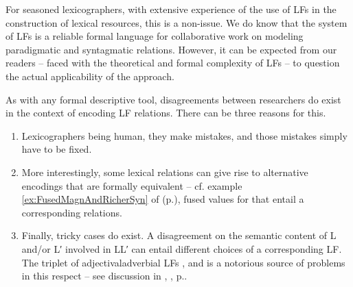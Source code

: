 For seasoned lexicographers, with extensive experience of the use of LFs in the construction of lexical resources, this is a non-issue. We do know that the system of LFs is a reliable formal language for collaborative work on modeling paradigmatic and syntagmatic relations. However, it can be expected from our readers -- faced with the theoretical and formal complexity of LFs -- to question the actual applicability of the approach.

As with any formal descriptive tool, disagreements between researchers do exist in the context of encoding LF relations. There can be three reasons for this.

\begin{enumerate}

\item Lexicographers being human, they make mistakes, and those mistakes simply have to be fixed.

\item More interestingly, some lexical relations can give rise to alternative encodings that are formally equivalent -- cf. example \ref{ex:FusedMagnAndRicherSyn} of  (p.\thinspace\pageref{ex:FusedMagnAndRicherSyn}), fused values for  that entail a corresponding  relations.

\item Finally, tricky cases do exist. A disagreement on the semantic content of L and/or L′ involved in L\thinspace{}\thinspace{}L′ can entail different choices of a corresponding LF. The triplet of adjectival\slashs adverbial LFs ,  and  is a notorious source of problems in this respect -- see discussion in , , p.\thinspace\pageref{par:tripletMagnVerBon}.

\end{enumerate}

